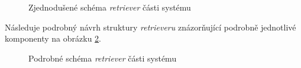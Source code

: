 \begin{figure}[hbt]
	\centering
	\caption{Zjednodušené schéma \emph{retriever} části systému}
	\label{retriever-simple-scheme}
\end{figure}

Následuje podrobný návrh struktury \emph{retrieveru} znázorňující podrobně jednotlivé komponenty na obrázku \ref{retriever-podrobne}.

\begin{figure}[hbt]
    \centering
	\caption{Podrobné schéma \emph{retriever} části systému}
	\label{retriever-podrobne}
\end{figure}

